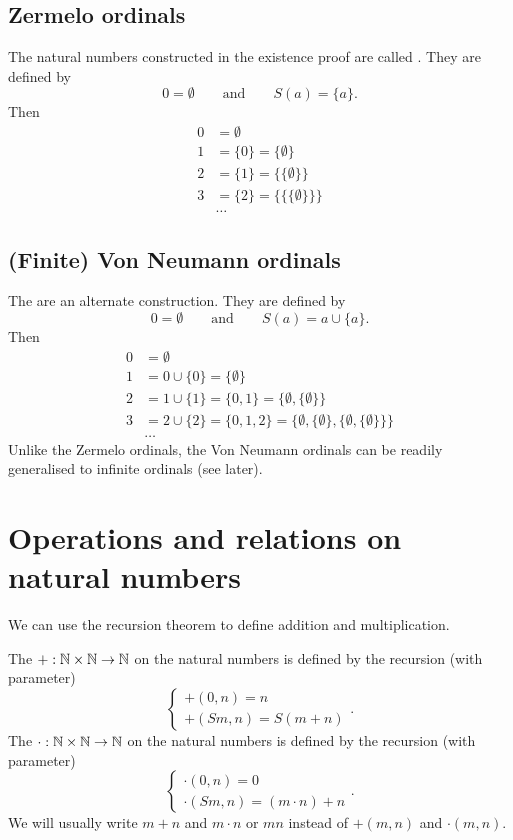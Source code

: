 \subsection{Zermelo ordinals}
The natural numbers constructed in the existence proof are called . They are defined by
\[ 0 = \emptyset \qquad \text{and} \qquad S(a) = \{a\}. \]
Then
\begin{align*}
0 &= \emptyset \\
1 &= \{0\} = \{\emptyset\} \\
2 &= \{1\} =  \{\{\emptyset\}\} \\
3 &= \{2\} = \{\{\{\emptyset\}\}\} \\
&\hdots
\end{align*}
\subsection{(Finite) Von Neumann ordinals}
The  are an alternate construction. They are defined by
\[ 0 = \emptyset \qquad \text{and} \qquad S(a) = a\cup\{a\}. \]
Then
\begin{align*}
0 &= \emptyset \\
1 &= 0\cup \{0\} = \{\emptyset\} \\
2 &= 1\cup \{1\} = \{0,1\} = \{\emptyset, \{\emptyset\}\} \\
3 &= 2\cup \{2\} = \{0,1,2\} = \{ \emptyset, \{\emptyset\}, \{\emptyset, \{\emptyset\}\} \} \\
&\hdots
\end{align*}
Unlike the Zermelo ordinals, the Von Neumann ordinals can be readily generalised to infinite ordinals (see later).
\section{Operations and relations on natural numbers}
We can use the recursion theorem to define addition and multiplication.
\begin{definition}
The  $+:\mathbb{N}\times \mathbb{N} \to \mathbb{N}$ on the natural numbers is defined by the recursion (with parameter)
\[ \begin{cases}
+(0,n) = n \\
+(Sm, n) = S(m+n)
\end{cases}. \]
The  $\cdot:\mathbb{N}\times \mathbb{N} \to \mathbb{N}$ on the natural numbers is defined by the recursion (with parameter)
\[ \begin{cases}
\cdot(0,n) = 0 \\
\cdot(Sm, n) = (m\cdot n)+n
\end{cases}. \]
We will usually write $m+n$ and $m\cdot n$ or $mn$ instead of $+(m,n)$ and $\cdot(m,n)$.
\end{definition}


